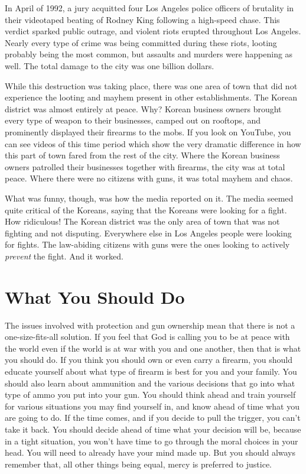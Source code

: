 In April of 1992, a jury acquitted four Los Angeles police officers of
brutality in their videotaped beating of Rodney King following a
high-speed chase. This verdict sparked public outrage, and violent
riots erupted throughout Los Angeles. Nearly every type of crime was
being committed during these riots, looting probably being the most
common, but assaults and murders were happening as well. The total
damage to the city was one billion dollars. 

While this destruction
was taking place, there was one area of town that did not experience
the looting and mayhem present in other establishments. The Korean
district was almost entirely at peace. Why?  Korean business owners
brought every type of weapon to their businesses, camped out on
rooftops, and prominently displayed their firearms to the mobs. If you
look on YouTube, you can see videos of this time period which show the
very dramatic difference in how this part of town fared from the rest
of the city. Where the Korean business owners patrolled their
businesses together with firearms, the city was at total peace. Where
there were no citizens with guns, it was total mayhem and chaos.

What was funny, though, was how the media reported on it. The media
seemed quite critical of the Koreans, saying that the Koreans were
looking for a fight. How ridiculous!  The Korean district was the only
area of town that was not fighting and not disputing. Everywhere else
in Los Angeles people were looking for fights. The law-abiding citizens
with guns were the ones looking to actively \textit{prevent} the fight.
And it worked.

\section{What You Should Do}

The issues involved with protection and gun ownership mean that there is
not a one-size-fits-all solution. If you feel that God is calling you
to be at peace with the world even if the world is at war with you and
one another, then that is what you should do. If you think you should
own or even carry a firearm, you should educate yourself about what
type of firearm is best for you and your family. You should also learn
about ammunition and the various decisions that go into what type of
ammo you put into your gun. You should think ahead and train yourself
for various situations you may find yourself in, and know ahead of time
what you are going to do. If the time comes, and if you decide to pull
the trigger, you can’t take it back. You should decide ahead of time
what your decision will be, because in a tight situation, you won’t
have time to go through the moral choices in your head. You will need
to already have your mind made up. But you should always remember that,
all other things being equal, mercy is preferred to justice. 

